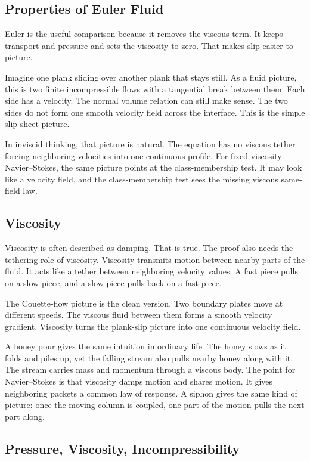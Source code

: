 \documentclass[11pt]{article}
\begin{document}
\subsection{Properties of Euler Fluid}

Euler is the useful comparison because it removes the viscous term.
It keeps transport and pressure and sets the viscosity to zero.
That makes slip easier to picture.

Imagine one plank sliding over another plank that stays still.
As a fluid picture, this is two finite incompressible flows with a tangential break between them.
Each side has a velocity.
The normal volume relation can still make sense.
The two sides do not form one smooth velocity field across the interface.
This is the simple slip-sheet picture.

In inviscid thinking, that picture is natural.
The equation has no viscous tether forcing neighboring velocities into one continuous profile.
For fixed-viscosity Navier--Stokes, the same picture points at the class-membership test.
It may look like a velocity field, and the class-membership test sees the missing viscous same-field law.

\subsection{Viscosity}

Viscosity is often described as damping.
That is true.
The proof also needs the tethering role of viscosity.
Viscosity transmits motion between nearby parts of the fluid.
It acts like a tether between neighboring velocity values.
A fast piece pulls on a slow piece, and a slow piece pulls back on a fast piece.

The Couette-flow picture is the clean version.
Two boundary plates move at different speeds.
The viscous fluid between them forms a smooth velocity gradient.
Viscosity turns the plank-slip picture into one continuous velocity field.

A honey pour gives the same intuition in ordinary life.
The honey slows as it folds and piles up, yet the falling stream also pulls nearby honey along with it.
The stream carries mass and momentum through a viscous body.
The point for Navier--Stokes is that viscosity damps motion and shares motion.
It gives neighboring packets a common law of response.
A siphon gives the same kind of picture: once the moving column is coupled, one part of the motion pulls the next part along.

\subsection{Pressure, Viscosity, Incompressibility}
\end{document}
